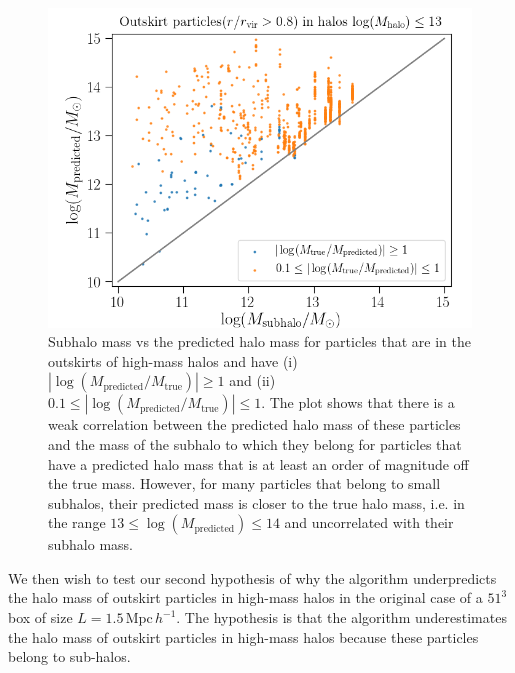 \documentclass[11pt]{article}
\begin{document}
\begin{figure}[t]
	\centering
	\includegraphics[width=0.65\columnwidth]{z0/outskirt_predictions_vs_subhalo_mass_all}
	\caption{Subhalo mass vs the predicted halo mass for particles that are in the outskirts of high-mass halos and have (i) $| \log(M_\mathrm{predicted}/M_\mathrm{true}) | \geq 1$ and (ii) $0.1 \leq | \log(M_\mathrm{predicted}/M_\mathrm{true}) | \leq 1$. The plot shows that there is a weak correlation between the predicted halo mass of these particles and the mass of the subhalo to which they belong for particles that have a predicted halo mass that is at least an order of magnitude off the true mass. However, for many particles that belong to small subhalos, their predicted mass is closer to the true halo mass, i.e. in the range $13 \leq \log(M_\mathrm{predicted}) \leq 14$ and uncorrelated with their subhalo mass.}
	\label{subhalo_mass_vs_predicted_mass}
\end{figure}

We then wish to test our second hypothesis of why the algorithm underpredicts the halo mass of outskirt particles in high-mass halos in the original case of a $51^3$ box of size $L=1.5 \, \mathrm{Mpc} \, h^{-1}$. The hypothesis is that the algorithm underestimates the halo mass of outskirt particles in high-mass halos because these particles belong to sub-halos. 
\end{document}
